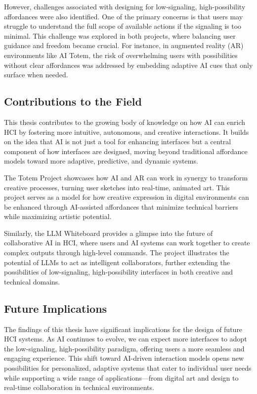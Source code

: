 However, challenges associated with designing for low-signaling, high-possibility affordances were also identified.
One of the primary concerns is that users may struggle to understand the full scope of available actions if the signaling is too minimal.
This challenge was explored in both projects, where balancing user guidance and freedom became crucial.
For instance, in augmented reality (AR) environments like AI Totem, the risk of overwhelming users with possibilities without clear affordances was addressed by embedding adaptive AI cues that only surface when needed.

\subsection{Contributions to the Field}
This thesis contributes to the growing body of knowledge on how AI can enrich HCI by fostering more intuitive, autonomous, and creative interactions.
It builds on the idea that AI is not just a tool for enhancing interfaces but a central component of how interfaces are designed, moving beyond traditional affordance models toward more adaptive, predictive, and dynamic systems.

The Totem Project showcases how AI and AR can work in synergy to transform creative processes, turning user sketches into real-time, animated art.
This project serves as a model for how creative expression in digital environments can be enhanced through AI-assisted affordances that minimize technical barriers while maximizing artistic potential.

Similarly, the LLM Whiteboard provides a glimpse into the future of collaborative AI in HCI, where users and AI systems can work together to create complex outputs through high-level commands.
The project illustrates the potential of LLMs to act as intelligent collaborators, further extending the possibilities of low-signaling, high-possibility interfaces in both creative and technical domains.

\subsection{Future Implications}
The findings of this thesis have significant implications for the design of future HCI systems.
As AI continues to evolve, we can expect more interfaces to adopt the low-signaling, high-possibility paradigm, offering users a more seamless and engaging experience.
This shift toward AI-driven interaction models opens new possibilities for personalized, adaptive systems that cater to individual user needs while supporting a wide range of applications—from digital art and design to real-time collaboration in technical environments.

